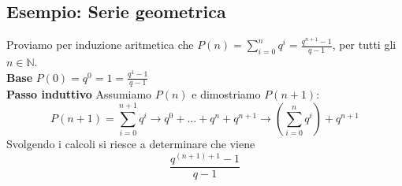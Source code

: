 \documentclass[12pt, a4paper]{report}
\begin{document}
\subsection*{Esempio: Serie geometrica}
Proviamo per induzione aritmetica che $P(n)=\sum_{i=0}^{n}q^{i}=\frac{q^{n+1}-1}{q-1}$, per tutti gli $n\in \mathbb{N}$.\\
\textbf{Base} $P(0)=q^{0}=1=\frac{q^{1}-1}{q-1}$\\
\textbf{Passo induttivo} Assumiamo $P(n)$ e dimostriamo $P(n+1)$:
\begin{equation*}
    P(n+1)=\sum_{i=0}^{n+1}q^{i}\rightarrow q^{0}+\ldots+q^{n}+q^{n+1}\rightarrow\left(\sum_{i=0}^{n}q^{i}\right)+q^{n+1}
\end{equation*}
Svolgendo i calcoli si riesce a determinare che viene
\begin{equation*}
    \frac{q^{(n+1)+1}-1}{q-1}
\end{equation*}
\end{document}
